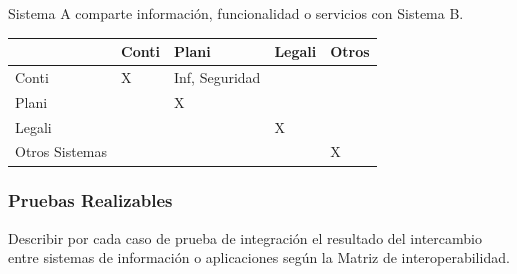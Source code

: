 \documentclass[
  paper=a4,
  ,captions=tableheading
]{scrartcl}
\begin{document}
Sistema A comparte información, funcionalidad o servicios con Sistema B.

\begin{longtable}[]{@{}lllll@{}}
\toprule\noalign{}
& Conti & Plani & Legali & Otros \\
\midrule\noalign{}
\endhead
\bottomrule\noalign{}
\endlastfoot
Conti & X & Inf, Seguridad & & \\
Plani & & X & & \\
Legali & & & X & \\
Otros Sistemas & & & & X \\
\end{longtable}

\subsubsection{Pruebas Realizables}\label{sec:pruebas-realizables-4}

Describir por cada caso de prueba de integración el resultado del
intercambio entre sistemas de información o aplicaciones según la Matriz
de interoperabilidad.
\end{document}
